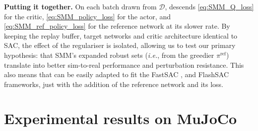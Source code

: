 \documentclass{article} %
\newcommand{\ie}{\textit{i.e.}}
\newcommand{\hc}[1]{{\footnotesize\color{olive} HC: #1}}
\begin{document}

    \textbf{Putting it together.}
    On each batch drawn from $\mathcal{D}$, \ourMethod descends \autoref{eq:SMM_Q_loss} for the critic, \autoref{eq:SMM_policy_loss} for the actor, and \autoref{eq:SMM_ref_policy_loss} for the reference network at its slower rate.
    By keeping the replay buffer, target networks and critic architecture identical to SAC, the effect of the regulariser is isolated, allowing us to test our primary hypothesis: that SMM's expanded robust sets (\ie, from the greedier $\pi^\text{ref}$) translate into better sim-to-real performance and perturbation resistance.  
    This also means that \ourMethod can be easily adapted to fit the FastSAC \citep{seo2025learning_fastsac}, and FlashSAC \citep{kim2026flashsac} frameworks, just with the addition of the reference network and its loss.


\section{Experimental results on MuJoCo} \label{sec:mujoco}
\end{document}
